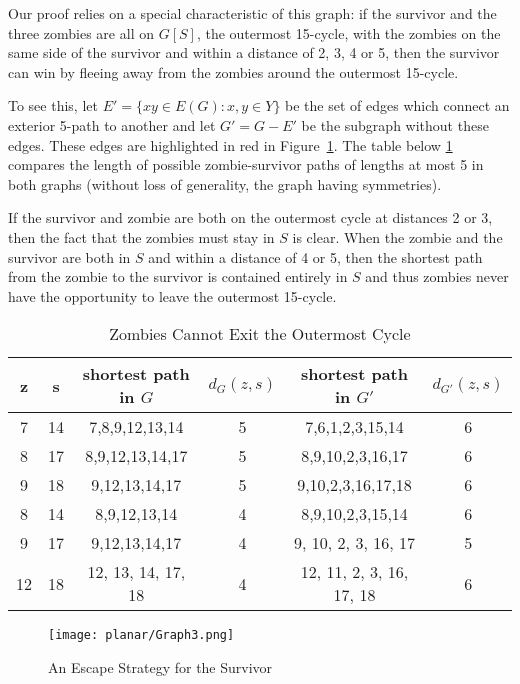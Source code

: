 Our proof relies on a special characteristic of this graph: if the survivor and the three zombies are all on $G[S]$, the outermost 15-cycle,  with
the zombies on the same side of the survivor and within a distance of 2, 3, 4 or 5, then the survivor can win by fleeing away from the zombies around the outermost 15-cycle.

To see this, let $E' = \{xy \in E(G) : x, y \in Y\}$ be the set of edges which connect an exterior 5-path to another and let $G' = G - E'$ be the subgraph without these edges. These edges are highlighted in red in Figure~\ref{fig:planarG3}.
The table below \ref{table outermost cycle} compares the length of possible zombie-survivor paths of
lengths at most 5 in both graphs (without loss of generality, the graph having symmetries).

If the survivor and zombie are both on the outermost cycle at distances 2 or 3, then
the fact that the zombies must stay in $S$ is clear.
When the zombie and the survivor are both in $S$ and within a distance of 4 or 5, then the shortest path from the zombie to the survivor is contained entirely in $S$ and thus zombies never have the opportunity to leave the outermost 15-cycle.

\begin{table}
\centering
\begin{tabular}{c | c | c | c | c | c}
z & s & shortest path in $G$ & $d_{G}(z,s)$ & shortest path in $G'$ & $d_{G'}(z,s)$  \\
\hline
7 & 14 & 7,8,9,12,13,14 & 5 & 7,6,1,2,3,15,14 & 6 \\
8 & 17 & 8,9,12,13,14,17 & 5 & 8,9,10,2,3,16,17 & 6 \\
9 & 18 & 9,12,13,14,17 & 5 & 9,10,2,3,16,17,18 & 6 \\
\hline
8 & 14 & 8,9,12,13,14 & 4 & 8,9,10,2,3,15,14 & 6 \\
9 & 17 & 9,12,13,14,17 & 4 & 9, 10, 2, 3, 16, 17 & 5 \\
12 & 18 & 12, 13, 14, 17, 18 & 4 & 12, 11, 2, 3, 16, 17, 18 & 6
\end{tabular}
\caption{Zombies Cannot Exit the Outermost Cycle \label{table outermost cycle}}
\end{table}

\begin{figure}
\centering
\texttt{[image: planar/Graph3.png]}
\caption{An Escape Strategy for the Survivor\label{fig:planarG3}}
\end{figure}


